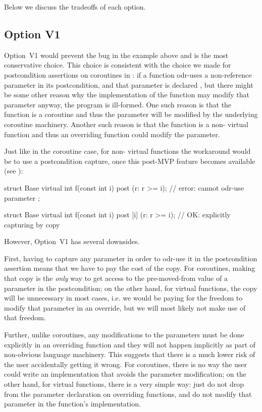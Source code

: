 Below we discuss the tradeoffs of each option.

\subsection*{Option V1}

Option~V1 would prevent the bug in the example above and is the most conservative choice. This choice is consistent with the choice we made for postcondition assertions on coroutines in \cite{P2900R10}: if a function odr-uses a non-reference parameter in its postcondition, and that parameter is declared , but there might be some other reason why the implementation of the function may modify that parameter anyway, the program is ill-formed. One such reason is that the function is a coroutine and thus the parameter will be modified by the underlying coroutine machinery. Another such reason is that the function is a non- virtual function and thus an overriding function could modify the parameter.

Just like in the coroutine case, for non- virtual functions the workaround would be to use a postcondition capture, once this post-MVP feature becomes available (see \cite{P3098R0}):
\begin{codeblock}
struct Base {
  virtual int f(const int i) post (r: r >= i);     // error: cannot odr-use parameter  
};

struct Base {
  virtual int f(const int i) post [i] (r: r >= i); // OK: explicitly capturing  by copy
}
\end{codeblock}

However, Option~V1 has several downsides.

First, having to capture any parameter in order to odr-use it in the postcondition assertion means that we have to pay the cost of the copy. For coroutines, making that copy is the \emph{only} way to get access to the pre-moved-from value of a parameter in the postcondition; on the other hand, for virtual functions, the copy will be unnecessary in most cases, i.e. we would be paying for the freedom to modify that parameter in an override, but we will most likely not make use of that freedom.

Further, unlike coroutines, any modifications to the parameters must be done explicitly in an overriding function and they will not happen implicitly as part of non-obvious language machinery. This suggests that there is a much lower risk of the user accidentally getting it wrong. For coroutines, there is no way the user could write an implementation that avoids the parameter modification; on the other hand, for virtual functions, there is a very simple way: just do not drop  from the parameter declaration on overriding functions, and do not modify that parameter in the function's implementation. 

